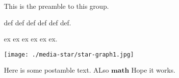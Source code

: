 This is the preamble to this group.
\begin{group}
  
\begin{definition}
\label{def:title}
  def def def
  def
  def def.
\end{definition}



\begin{example}
\label{ex:title}
  ex ex ex
  ex
  ex ex.
  \begin{center}
  \texttt{[image: ./media-star/star-graph1.jpg]}
  \end{center}
\end{example}
\end{group}

Here is some postamble text.
ALso $\mathbf{math}$
Hope it works.
